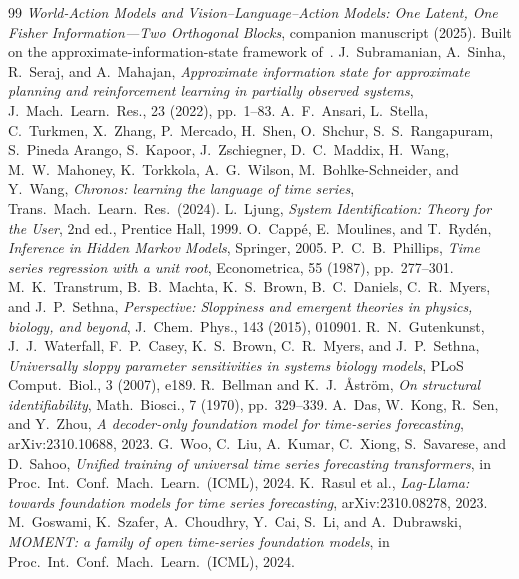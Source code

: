 \documentclass[10pt]{article}
\theoremstyle{plain}
\theoremstyle{definition}
\theoremstyle{remark}
\begin{document}
\begin{thebibliography}{99}
\small\setlength{\itemsep}{1pt}
 \emph{World-Action Models and Vision--Language--Action Models:
  One Latent, One Fisher Information---Two Orthogonal Blocks}, companion
  manuscript (2025). Built on the approximate-information-state framework
  of~\cite{ais2022}.
 J.~Subramanian, A.~Sinha, R.~Seraj, and A.~Mahajan,
  \emph{Approximate information state for approximate planning and reinforcement
  learning in partially observed systems}, J.~Mach.~Learn.~Res., 23 (2022),
  pp.~1--83.
 A.~F.~Ansari, L.~Stella, C.~Turkmen, X.~Zhang, P.~Mercado,
  H.~Shen, O.~Shchur, S.~S.~Rangapuram, S.~Pineda Arango, S.~Kapoor,
  J.~Zschiegner, D.~C.~Maddix, H.~Wang, M.~W.~Mahoney, K.~Torkkola,
  A.~G.~Wilson, M.~Bohlke-Schneider, and Y.~Wang, \emph{Chronos: learning the
  language of time series}, Trans.~Mach.~Learn.~Res.~(2024).
 L.~Ljung, \emph{System Identification: Theory for the User},
  2nd ed., Prentice Hall, 1999.
 O.~Capp\'e, E.~Moulines, and T.~Ryd\'en, \emph{Inference in
  Hidden Markov Models}, Springer, 2005.
 P.~C.~B.~Phillips, \emph{Time series regression with a
  unit root}, Econometrica, 55 (1987), pp.~277--301.
 M.~K.~Transtrum, B.~B.~Machta, K.~S.~Brown,
  B.~C.~Daniels, C.~R.~Myers, and J.~P.~Sethna, \emph{Perspective: Sloppiness
  and emergent theories in physics, biology, and beyond}, J.~Chem.~Phys., 143
  (2015), 010901.
 R.~N.~Gutenkunst, J.~J.~Waterfall, F.~P.~Casey,
  K.~S.~Brown, C.~R.~Myers, and J.~P.~Sethna, \emph{Universally sloppy parameter
  sensitivities in systems biology models}, PLoS Comput.~Biol., 3 (2007), e189.
 R.~Bellman and K.~J.~{\AA}str\"om, \emph{On structural
  identifiability}, Math.~Biosci., 7 (1970), pp.~329--339.
 A.~Das, W.~Kong, R.~Sen, and Y.~Zhou, \emph{A decoder-only
  foundation model for time-series forecasting}, arXiv:2310.10688, 2023.
 G.~Woo, C.~Liu, A.~Kumar, C.~Xiong, S.~Savarese, and D.~Sahoo,
  \emph{Unified training of universal time series forecasting transformers},
  in Proc.~Int.~Conf.~Mach.~Learn.~(ICML), 2024.
 K.~Rasul et al., \emph{Lag-Llama: towards foundation models
  for time series forecasting}, arXiv:2310.08278, 2023.
 M.~Goswami, K.~Szafer, A.~Choudhry, Y.~Cai, S.~Li, and
  A.~Dubrawski, \emph{MOMENT: a family of open time-series foundation models},
  in Proc.~Int.~Conf.~Mach.~Learn.~(ICML), 2024.

\end{thebibliography}
\end{document}
